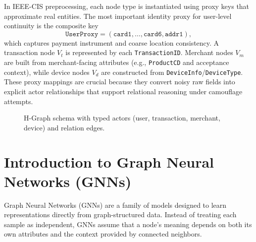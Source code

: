 \documentclass[12pt,a4paper]{report}
\begin{document}
In IEEE-CIS preprocessing, each node type is instantiated using proxy keys that approximate real entities. The most important identity proxy for user-level continuity is the composite key
\[
\texttt{UserProxy} = (\texttt{card1},\ldots,\texttt{card6},\texttt{addr1}),
\]
which captures payment instrument and coarse location consistency. A transaction node $V_t$ is represented by each \texttt{TransactionID}. Merchant nodes $V_m$ are built from merchant-facing attributes (e.g., \texttt{ProductCD} and acceptance context), while device nodes $V_d$ are constructed from \texttt{DeviceInfo}/\texttt{DeviceType}. These proxy mappings are crucial because they convert noisy raw fields into explicit actor relationships that support relational reasoning under camouflage attempts.

\begin{figure}[htbp]
\centering
{}
\caption{H-Graph schema with typed actors (user, transaction, merchant, device) and relation edges.}
\label{fig:heterogeneous-graph-schema}
\end{figure}

\section{Introduction to Graph Neural Networks (GNNs)}
Graph Neural Networks (GNNs) are a family of models designed to learn representations directly from graph-structured data. Instead of treating each sample as independent, GNNs assume that a node's meaning depends on both its own attributes and the context provided by connected neighbors.
\end{document}
